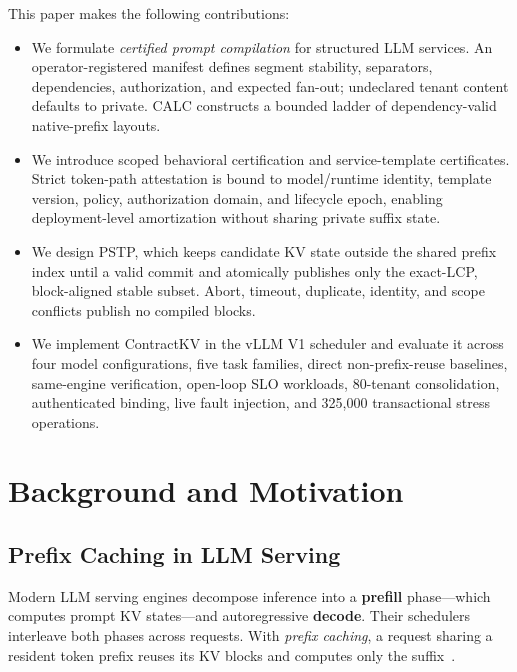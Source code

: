 \documentclass[journal]{IEEEtran}
\begin{document}
This paper makes the following contributions:
\begin{itemize}
    \item We formulate \emph{certified prompt compilation} for structured LLM services. An operator-registered manifest defines segment stability, separators, dependencies, authorization, and expected fan-out; undeclared tenant content defaults to private. CALC constructs a bounded ladder of dependency-valid native-prefix layouts.
    \item We introduce scoped behavioral certification and service-template certificates. Strict token-path attestation is bound to model/runtime identity, template version, policy, authorization domain, and lifecycle epoch, enabling deployment-level amortization without sharing private suffix state.
    \item We design PSTP, which keeps candidate KV state outside the shared prefix index until a valid commit and atomically publishes only the exact-LCP, block-aligned stable subset. Abort, timeout, duplicate, identity, and scope conflicts publish no compiled blocks.
    \item We implement ContractKV in the vLLM V1 scheduler and evaluate it across four model configurations, five task families, direct non-prefix-reuse baselines, same-engine verification, open-loop SLO workloads, 80-tenant consolidation, authenticated binding, live fault injection, and 325{,}000 transactional stress operations.
\end{itemize}


\section{Background and Motivation}
\label{sec:background}

\subsection{Prefix Caching in LLM Serving}

Modern LLM serving engines decompose inference into a \textbf{prefill} phase---which computes prompt KV states---and autoregressive \textbf{decode}. Their schedulers interleave both phases across requests. With \emph{prefix caching}, a request sharing a resident token prefix reuses its KV blocks and computes only the suffix~\cite{vllm2023,sglang2024}.
\end{document}
